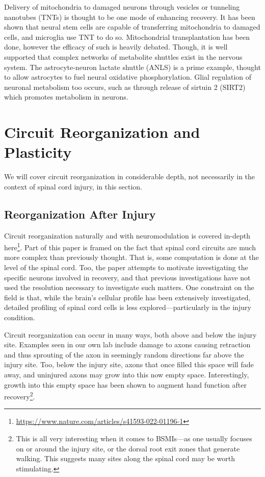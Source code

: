 \documentclass[12pt]{report}
\begin{document}
Delivery of mitochondria to damaged neurons through vesicles or tunneling nanotubes (TNTs) is thought to be one mode of enhancing recovery. It has been shown that neural stem cells are capable of transferring mitochondria to damaged cells, and microglia use TNT to do so. Mitochondrial transplantation has been done, however the efficacy of such is heavily debated. Though, it is well supported that complex networks of metabolite shuttles exist in the nervous system. The astrocyte-neuron lactate shuttle (ANLS) is a prime example, thought to allow astrocytes to fuel neural oxidative phosphorylation. Glial regulation of neuronal metabolism too occurs, such as through release of sirtuin 2 (SIRT2) which promotes metabolism in neurons. 





\chapter{Circuit Reorganization and Plasticity}

\label{sec:CircuitReorganization}

We will cover circuit reorganization in considerable depth, not necessarily in the context of spinal cord injury, in this section. 

\section{Reorganization After Injury}


Circuit reorganization naturally and with neuromodulation is covered in-depth here\footnote{\url{https://www.nature.com/articles/s41593-022-01196-1}}. Part of this paper is framed on the fact that spinal cord circuits are much more complex than previously thought. That is, some computation is done at the level of the spinal cord. Too, the paper attempts to motivate investigating the specific neurons involved in recovery, and that previous investigations have not used the resolution necessary to investigate such matters. One constraint on the field is that, while the brain's cellular profile has been extensively investigated, detailed profiling of spinal cord cells is less explored---particularly in the injury condition.\newline

Circuit reorganization can occur in many ways, both above and below the injury site. Examples seen in our own lab include damage to axons causing retraction and thus sprouting of the axon in seemingly random directions far above the injury site. Too, below the injury site, axons that once filled this space will fade away, and uninjured axons may grow into this now empty space. Interestingly, growth into this empty space has been shown to augment hand function after recovery\footnote{This is all very interesting when it comes to BSMIs---as one usually focuses on or around the injury site, or the dorsal root exit zones that generate walking. This suggests many sites along the spinal cord may be worth stimulating.}.\newline
\end{document}
